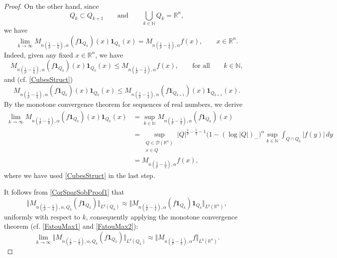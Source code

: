 \documentclass[11pt, a4paper,leqno]{amsart}
\theoremstyle{plain}
\numberwithin{equation}{section}
\theoremstyle{definition}
\theoremstyle{remark}
\begin{document}
\begin{proof}
On the other hand, since
\begin{equation}
\label{CubesStruct}Q_{k} \subset Q_{k+1} \qquad\text{and} \qquad\bigcup_{k
\in\mathbb{N}} Q_{k} = \mathbb{R}^{n},
\end{equation}
we have
\begin{equation}
\label{FatouMax1}\lim_{k \to\infty} M_{n (\frac{1}{p} - \frac{1}{q}), \alpha}
(f \mathbf{1}_{Q_{k}}) (x) \mathbf{1}_{Q_{k}} (x) = M_{n (\frac{1}{p} -
\frac{1}{q}), \alpha} f (x), \qquad x \in\mathbb{R}^{n}.
\end{equation}
Indeed, given any fixed $x \in\mathbb{R}^{n}$, we have
\[
M_{n (\frac{1}{p} - \frac{1}{q}), \alpha} (f \mathbf{1}_{Q_{k}}) (x)
\mathbf{1}_{Q_{k}} (x) \leq M_{n (\frac{1}{p} - \frac{1}{q}), \alpha} f (x),
\qquad\text{for all} \qquad k \in\mathbb{N},
\]
and (cf. \eqref{CubesStruct})
\begin{equation}
\label{FatouMax2}M_{n (\frac{1}{p} - \frac{1}{q}), \alpha} (f \mathbf{1}%
_{Q_{k}}) (x) \mathbf{1}_{Q_{k}} (x) \leq M_{n (\frac{1}{p} - \frac{1}{q}),
\alpha} (f \mathbf{1}_{Q_{k+1}}) (x) \mathbf{1}_{Q_{k+1}} (x).
\end{equation}
By the monotone convergence theorem for sequences of real numbers, we derive
\begin{align*}
\lim_{k \to\infty} M_{n (\frac{1}{p} - \frac{1}{q}), \alpha} (f \mathbf{1}%
_{Q_{k}}) (x) \mathbf{1}_{Q_{k}} (x)  &  = \sup_{k \in\mathbb{N}} M_{n
(\frac{1}{p} - \frac{1}{q}), \alpha} (f \mathbf{1}_{Q_{k}}) (x)\\
&  = \sup_{\substack{Q\in\mathcal{D}(\mathbb{R}^{n})\\x\in Q}}
|Q|^{\frac{1}{p}-\frac{1}{q}-1} \big(1- (\log|Q|)_{-} \big)^{\alpha} \sup_{k
\in\mathbb{N}} \int_{Q \cap Q_{k}}|f(y)| \,dy\\
&  = M_{n (\frac{1}{p} - \frac{1}{q}), \alpha} f (x),
\end{align*}
where we have used \eqref{CubesStruct} in the last step.

It follows from \eqref{CorSparSobProof1} that
\[
\Vert M_{n(\frac{1}{p}-\frac{1}{q}),\alpha,Q_{k}}(f\mathbf{1}_{Q_{k}}%
)\Vert_{L^{q}(Q_{k})}\approx\Vert M_{n(\frac{1}{p}-\frac{1}{q}),\alpha
}(f\mathbf{1}_{Q_{k}})\mathbf{1}_{Q_{k}}\Vert_{L^{q}(\mathbb{R}^{n})},
\]
uniformly with respect to $k$, consequently applying the monotone convergence
theorem (cf. \eqref{FatouMax1} and \eqref{FatouMax2}):
\begin{equation}
\lim_{k\rightarrow\infty}\Vert M_{n(\frac{1}{p}-\frac{1}{q}),\alpha,Q_{k}%
}(f\mathbf{1}_{Q_{k}})\Vert_{L^{q}(Q_{k})}\approx\Vert M_{n(\frac{1}{p}%
-\frac{1}{q}),\alpha}f\Vert_{L^{q}(\mathbb{R}^{n})}. \label{FatouMax3}%
\end{equation}



\end{proof}
\end{document}
